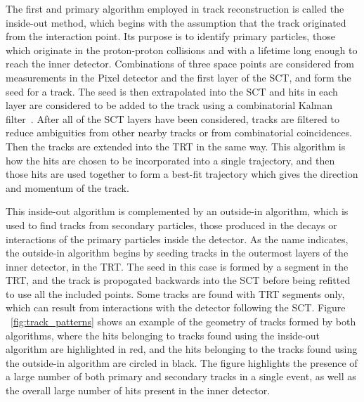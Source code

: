 The first and primary algorithm employed in track reconstruction is called the inside-out method, which begins with the assumption that the track originated from the interaction point.
Its purpose is to identify primary particles, those which originate in the proton-proton collisions and with a lifetime long enough to reach the inner detector.
Combinations of three space points are considered from measurements in the Pixel detector and the first layer of the \ac{SCT}, and form the seed for a track. 
The seed is then extrapolated into the \ac{SCT} and hits in each layer are considered to be added to the track using a combinatorial Kalman filter~\cite{tracking_performance}.
After all of the \ac{SCT} layers have been considered, tracks are filtered to reduce ambiguities from other nearby tracks or from combinatorial coincidences.
Then the tracks are extended into the \ac{TRT} in the same way.
This algorithm is how the hits are chosen to be incorporated into a single trajectory, and then those hits are used together to form a best-fit trajectory which gives the direction and momentum of the track.

This inside-out algorithm is complemented by an outside-in algorithm, which is used to find tracks from secondary particles, those produced in the decays or interactions of the primary particles inside the detector. 
As the name indicates, the outside-in algorithm begins by seeding tracks in the outermost layers of the inner detector, in the \ac{TRT}. 
The seed in this case is formed by a segment in the \ac{TRT}, and the track is propogated backwards into the \ac{SCT} before being refitted to use all the included points.
Some tracks are found with \ac{TRT} segments only, which can result from interactions with the detector following the \ac{SCT}.
Figure ~\ref{fig:track_patterns} shows an example of the geometry of tracks formed by both algorithms, where the hits belonging to tracks found using the inside-out algorithm are highlighted in red, and the hits belonging to the tracks found using the outside-in algorithm are circled in black.
The figure highlights the presence of a large number of both primary and secondary tracks in a single event, as well as the overall large number of hits present in the inner detector.

